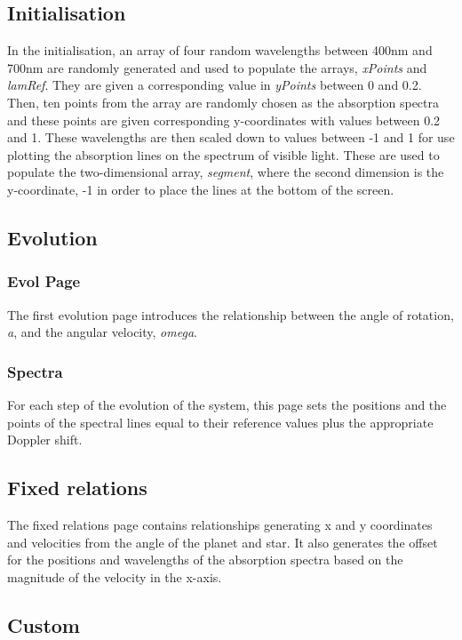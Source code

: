 \subsection*{Initialisation}
\label{sec-3-2}

In the initialisation, an array of four random wavelengths between
400nm and 700nm are randomly generated and used to populate the
arrays, \emph{xPoints} and \emph{lamRef}. They are given a corresponding value
in \emph{yPoints} between 0 and 0.2. Then, ten points from the array are
randomly chosen as the absorption spectra and these points are given
corresponding y-coordinates with values between 0.2 and 1. These wavelengths are then scaled down to values
between -1 and 1 for use plotting the absorption lines on the spectrum
of visible light. These are used to populate the two-dimensional
array, \emph{segment}, where the second dimension is the y-coordinate, -1
in order to place the lines at the bottom of the screen.
\subsection*{Evolution}
\label{sec-3-3}
\subsubsection*{Evol Page}
\label{sec-3-3-1}

The first evolution page introduces the relationship between the angle of rotation, \emph{a}, and the angular velocity, \emph{omega}.
\subsubsection*{Spectra}
\label{sec-3-3-2}

For each step of the evolution of the system, this page sets the positions and the points of the spectral lines equal to their reference values plus the appropriate Doppler shift.
\subsection*{Fixed relations}
\label{sec-3-4}

The fixed relations page contains relationships generating x and y coordinates and velocities from the angle of the planet and star.
It also generates the offset for the positions and wavelengths of the absorption spectra based on the magnitude of the velocity in the x-axis.
\subsection*{Custom}
\label{sec-3-5}

